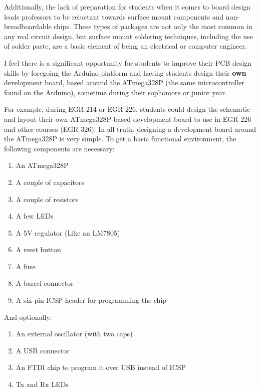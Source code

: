 \documentclass[12pt]{article}
\numberwithin{figure}{section}
\numberwithin{equation}{section}
\begin{document}
{\bigskip

Additionally, the lack of preparation for students when it comes to
board design leads professors to be reluctant towards surface mount
components and non-breadboardable chips. These types of packages are not
only the most common in any real circuit design, but surface mount
soldering techniques, including the use of solder paste, are a basic
element of being an electrical or computer engineer.

\bigskip

I feel there is a significant opportunity for students to improve their
PCB design skills by foregoing the Arduino platform and having students
design their \textbf{own} development board, based around the ATmega328P
(the same microcontroller found on the Arduino), sometime during their
sophomore or junior year.

\bigskip

For example, during EGR 214 or EGR 226, students could design the
schematic and layout their own ATmega328P-based development board to use
in EGR 226 and other courses (EGR 326). In all truth, designing a
development board around the ATmega328P is very simple. To get a basic
functional environment, the following components are necessary:

\begin{enumerate}
\itemsep1pt\parskip0pt
\item An ATmega328P
\item A couple of capacitors
\item A couple of resistors
\item A few LEDs
\item A 5V regulator (Like an LM7805)
\item A reset button
\item A fuse
\item A barrel connector
\item A six-pin ICSP header for programming the chip
\end{enumerate}

And optionally:

\begin{enumerate}
\itemsep1pt\parskip0pt
\item An external oscillator (with two caps)
\item A USB connector
\item An FTDI chip to program it over USB instead of ICSP
\item Tx and Rx LEDs
\end{enumerate}

}
\end{document}
